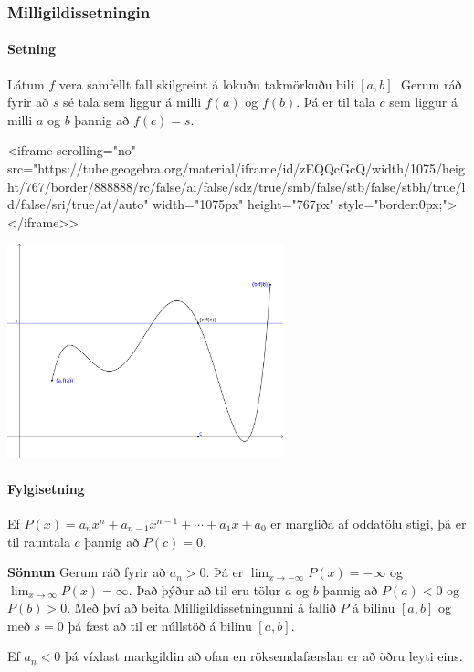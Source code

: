 \documentclass[icelandic,a4paper,12pt]{article}
\begin{document}
\subsubsection*{Milligildissetningin}
 \paragraph{Setning}
 Látum $f$ vera samfellt fall skilgreint á lokuðu takmörkuðu bili
$[a,b]$.  Gerum ráð fyrir að $s$ sé tala sem liggur á milli $f(a)$ og
$f(b)$.  Þá er til tala $c$ sem liggur á milli $a$ og $b$ þannig að
$f(c)=s$. 
 
<iframe scrolling="no" src="https://tube.geogebra.org/material/iframe/id/zEQQcGcQ/width/1075/height/767/border/888888/rc/false/ai/false/sdz/true/smb/false/stb/false/stbh/true/ld/false/sri/true/at/auto" width="1075px" height="767px" style="border:0px;"> </iframe>>
\begin{center}
 \includegraphics[width=8cm,keepaspectratio=true]{./myndir/kafli01/04_Milligildissetn.png}
\end{center}



 \paragraph{Fylgisetning}
Ef $P(x)=a_nx^n+a_{n-1}x^{n-1}+\cdots+a_1x+a_0$ er margliða af
oddatölu stigi, þá er til rauntala $c$ þannig að $P(c)=0$.
 
 \pause
 \textbf{Sönnun}
	Gerum ráð fyrir að $a_n>0$. \pause
	Þá er $\lim_{x\to -\infty} P(x) = -\infty$ og
	$\lim_{x\to \infty} P(x) = \infty$.\pause
	Það þýður að til eru tölur $a$ og $b$ 
	þannig að $P(a)<0$ og $P(b)>0$. \pause
	Með því að beita Milligildissetningunni á fallið $P$ á 
	bilinu $[a,b]$ og með $s=0$ þá fæst að til er núllstöð 
	á bilinu $[a,b]$.\pause
	
	Ef $a_n < 0$ þá víxlast markgildin að ofan en röksemdafærslan er
	að öðru leyti eins.
 
\end{document}

